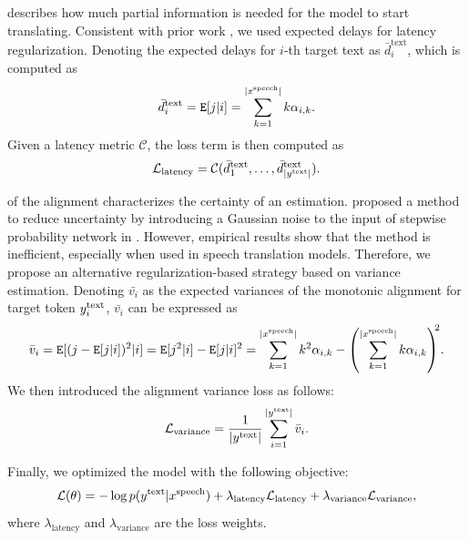 \begin{description}[leftmargin=0cm]
    \item[Latency] describes how much partial information is needed for the model to start translating.
Consistent with prior work \citep{arivazhagan_monotonic_2019, ma_monotonic_2019},
we used expected delays for latency regularization.
Denoting the expected delays for $i$-th target text as $\bar{d}^{\text{text}}_i$,
which is computed as
\begin{equation}
    \bar{d}^{\text{text}}_i = \texttt{E}[j | i] = \sum_{k=1}^{|x^{\text{speech}}|} k \alpha_{i,k}.
\end{equation}
Given a latency metric $\mathcal{C}$, the loss term is then computed as
\begin{equation}
	\mathcal{L}_{\text{latency}} = \mathcal{C}(\bar{d}^{\text{text}}_1, \ldots, \bar{d}^{\text{text}}_{|y^{\text{text}}|}).
\end{equation}
\item[Variance] of the alignment characterizes the certainty of an estimation.
\citet{arivazhagan_monotonic_2019} proposed a method to reduce uncertainty by introducing a Gaussian noise to the input of stepwise probability network in .
However, empirical results show that the method is inefficient, especially when used in speech translation models.
Therefore, we propose an alternative regularization-based strategy based on variance estimation.
Denoting $\bar{v_i}$ as the expected variances of the monotonic alignment for target token $y^{\text{text}}_i$, $\bar{v_i}$ can be expressed as
\begin{equation}
	\bar{v}_i = \texttt{E}[(j - \texttt{E}[j | i])^2 | i] = \texttt{E}[j^2 | i] -  \texttt{E}[j | i]^2 = \sum_{k=1}^{|x^{\text{speech}}|} k^2 \alpha_{i,k} - \left(\sum_{k=1}^{|x^{\text{speech}}|} k \alpha_{i,k}\right)^{\!\!2}\!.
\end{equation}
We then introduced the alignment variance loss as follows:
\begin{equation}
	\mathcal{L}_{\text{variance}} = \frac{1}{|y^{\text{text}}|}\sum_{i=1}^{|y^{\text{text}}|} \bar{v}_i.
\end{equation}
\end{description}
Finally, we optimized the model with the following objective:
 \begin{equation}
 	\mathcal{L}(\theta) = -\log p(y^{\text{text}} | x^{\text{speech}}) + \lambda_{\text{latency}} \mathcal{L}_{\text{latency}} +  \lambda_{\text{variance}} \mathcal{L}_{\text{variance}},
 \end{equation}
 where $\lambda_{\text{latency}}$ and $\lambda_{\text{variance}}$ are the loss weights.





